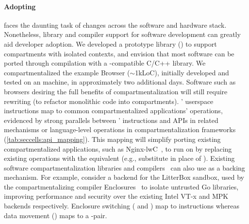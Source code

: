\paragraph{Adopting \seccells}
\seccells faces the daunting task of changes across the software and 
hardware stack.
Nonetheless, library and compiler support for software development
can greatly aid developer adoption.
We developed a prototype library
()
to support compartments with isolated contexts, and envision that
most software can be ported through compilation with a
\seccells-compatible C/C++ library.
We compartmentalized the example Browser ($\sim$1kLoC), 
initially developed and tested on an  machine, 
in approximately two additional days.
Software such as browsers desiring the full benefits of compartmentalization
will still require rewriting (to refactor monolithic code into compartments).
\seccells' userspace instructions map to common compartmentalized
applications' operations, evidenced by strong parallels between
\seccells' instructions and APIs in related mechanisms or 
language-level operations in compartmentalization
frameworks (\autoref{tab:seccells:api_mapping}).
This mapping will simplify porting existing compartmentalized
applications, such as Nginx-lwC~\cite{LittonVE0BD16}, to run on \seccells
by replacing existing operations with the \seccells equivalent 
(e.g., substitute \sdswitch in place of ).
Existing software compartmentalization libraries and compilers~\cite{HsuHEP16}
can also use \seccells as a backing mechanism.
%
For example, consider a \seccells backend for the LitterBox sandbox,
used by the compartmentalizing compiler Enclosures~\cite{GhosnKPLB21}
to isolate untrusted Go libraries, improving performance and security over
the existing Intel VT-x and MPK backends respectively.
Enclosure switching ( and ) map to \sdswitch
instructions whereas data movement () maps to a 
\sctfer-\screcv pair.

